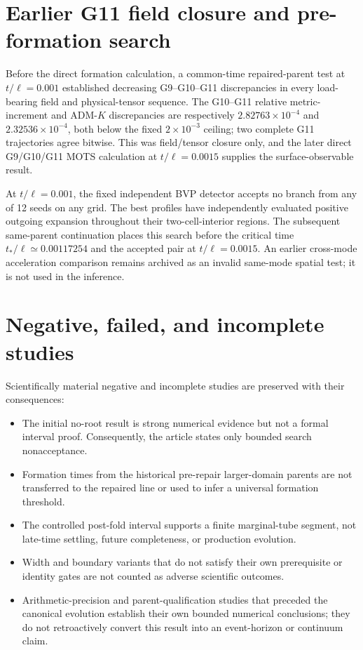 \documentclass[11pt]{article}
\begin{document}
\section{Earlier G11 field closure and pre-formation search}
\label{sec:repaired-preformation}

Before the direct formation calculation, a common-time repaired-parent test at
$t/\ell=0.001$ established decreasing G9--G10--G11 discrepancies in every
load-bearing field and physical-tensor sequence.  The G10--G11 relative
metric-increment and ADM-$K$ discrepancies are respectively
$2.82763\times10^{-4}$ and $2.32536\times10^{-4}$, both below the fixed
$2\times10^{-3}$ ceiling; two complete G11 trajectories agree bitwise.  This
was field/tensor closure only, and the later direct G9/G10/G11 MOTS calculation
at $t/\ell=0.0015$ supplies the surface-observable result.

At $t/\ell=0.001$, the fixed independent BVP detector accepts no branch from
any of 12 seeds on any grid.  The best profiles have independently evaluated
positive outgoing expansion throughout their two-cell-interior regions.  The
subsequent same-parent continuation places this search before the critical time
$t_*/\ell\simeq0.00117254$ and the accepted pair at $t/\ell=0.0015$.
An earlier cross-mode acceleration comparison remains archived as an invalid
same-mode spatial test; it is not used in the inference.

\section{Negative, failed, and incomplete studies}

Scientifically material negative and incomplete studies are preserved with
their consequences:
\begin{itemize}
\item The initial no-root result is strong numerical evidence but not a formal
interval proof.  Consequently, the article states only bounded search
nonacceptance.
\item Formation times from the historical pre-repair larger-domain parents are
not transferred to the repaired line or used to infer a universal formation
threshold.
\item The controlled post-fold interval supports a finite marginal-tube
segment, not late-time settling, future completeness, or production evolution.
\item Width and boundary variants that do not satisfy their own prerequisite
or identity gates are not counted as adverse scientific outcomes.
\item Arithmetic-precision and parent-qualification studies that preceded the
canonical evolution establish their own bounded numerical conclusions; they do
not retroactively convert this result into an event-horizon or continuum
claim.
\end{itemize}
\end{document}
